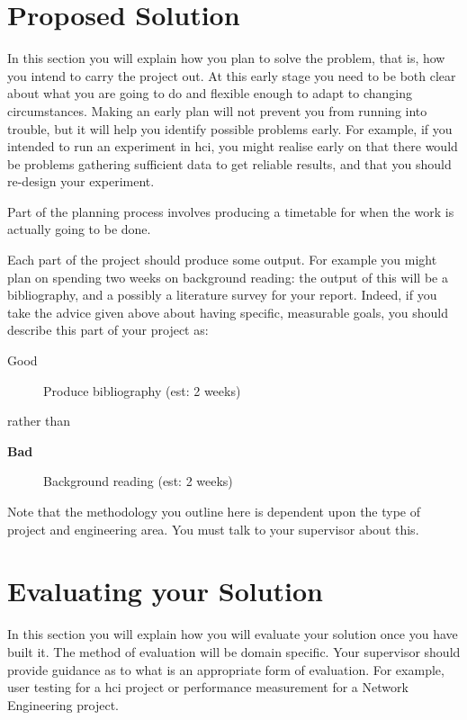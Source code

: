 \documentclass[11pt, a4paper, oneside, openright]{article}
\begin{document}
\section{Proposed Solution}

In this section you will explain how you plan to solve the problem, that is, how
you intend to carry the project out. At this early stage you need to be both
clear about what you are going to do and flexible enough to adapt to changing
circumstances. Making an early plan will not prevent you from running into
trouble, but it will help you identify possible problems early. For example, if
you intended to run an experiment in \gls{hci}, you might realise early on that
there would be problems gathering sufficient data to get reliable results, and
that you should re-design your experiment.

Part of the planning process involves producing a timetable for when the work is
actually going to be done.

Each part of the project should produce some output. For example you might plan
on spending two weeks on background reading: the output of this will be a
bibliography, and a possibly a literature survey for your report. Indeed, if you
take the advice given above about having specific, measurable goals, you should
describe this part of your project as:

\begin{description}
\item[Good] Produce bibliography (est: 2 weeks)
\end{description}
rather than
\begin{description}
\item[\bf Bad] Background reading (est: 2 weeks)
\end{description}

Note that the methodology you outline here is dependent upon the type of project
and engineering area. You must talk to your supervisor about this.

\section{Evaluating your Solution}

In this section you will explain how you will evaluate your solution once you
have built it. The method of evaluation will be domain specific. Your supervisor
should provide guidance as to what is an appropriate form of evaluation. For
example, user testing for a \gls{hci} project or performance measurement for a
Network Engineering project.
\end{document}
